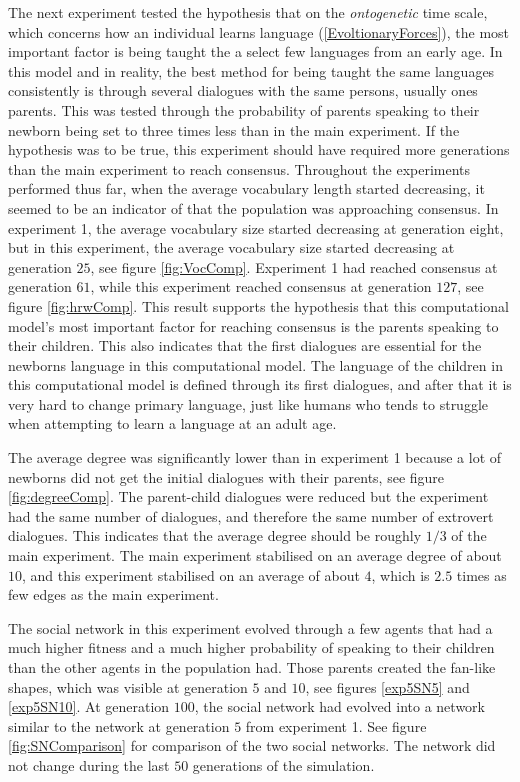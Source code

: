 The next experiment tested the hypothesis that on the \textit{ontogenetic} time scale, which concerns how an individual learns language (\ref{EvoltionaryForces}), the most important factor is being taught the a select few languages from an early age. In this model and in reality, the best method for being taught the same languages consistently is through several dialogues with the same persons, usually ones parents. This was tested through the probability of parents speaking to their newborn being set to three times less than in the main experiment. If the hypothesis was to be true, this experiment should have required more generations than the main experiment to reach consensus. Throughout the experiments performed thus far, when the average vocabulary length started decreasing, it seemed to be an indicator of that the population was approaching consensus. In experiment 1, the average vocabulary size started decreasing at generation eight, but in this experiment, the average vocabulary size started decreasing at generation $25$, see figure \ref{fig:VocComp}. Experiment 1 had reached consensus at generation $61$, while this experiment reached consensus at generation $127$, see figure \ref{fig:hrwComp}. This result supports the hypothesis that this computational model's most important factor for reaching consensus is the parents speaking to their children. This also indicates that the first dialogues are essential for the newborns language in this computational model. The language of the children in this computational model is defined through its first dialogues, and after that it is very hard to change primary language, just like humans who tends to struggle when attempting to learn a language at an adult age. 

The average degree was significantly lower than in experiment 1 because a lot of newborns did not get the initial dialogues with their parents, see figure \ref{fig:degreeComp}. The parent-child dialogues were reduced but the experiment had the same number of dialogues, and therefore the same number of extrovert dialogues. This indicates that the average degree should be roughly $1/3$ of the main experiment. The main experiment stabilised on an average degree of about $10$, and this experiment stabilised on an average of about $4$, which is $2.5$ times as few edges as the main experiment.

The social network in this experiment evolved through a few agents that had a much higher fitness and a much higher probability of speaking to their children than the other agents in the population had. Those parents created the fan-like shapes, which was visible at generation $5$ and $10$, see figures \ref{exp5SN5} and \ref{exp5SN10}. At generation $100$, the social network had evolved into a network similar to the network at generation $5$ from experiment 1. See figure \ref{fig:SNComparison} for comparison of the two social networks. The network did not change during the last $50$ generations of the simulation.

